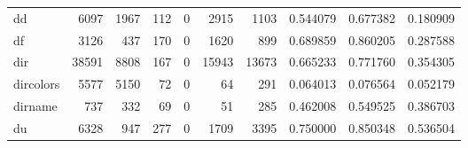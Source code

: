 \begin{longtable}{lrrrrrrrrr}
dd        &                                               6097 &                                               1967 &                                                112 &                                                  0 &                                               2915 &                                               1103 &                                           0.544079 &                               0.677382 &                             0.180909 \\
df        &                                               3126 &                                                437 &                                                170 &                                                  0 &                                               1620 &                                                899 &                                           0.689859 &                               0.860205 &                             0.287588 \\
dir       &                                              38591 &                                               8808 &                                                167 &                                                  0 &                                              15943 &                                              13673 &                                           0.665233 &                               0.771760 &                             0.354305 \\
dircolors &                                               5577 &                                               5150 &                                                 72 &                                                  0 &                                                 64 &                                                291 &                                           0.064013 &                               0.076564 &                             0.052179 \\
dirname   &                                                737 &                                                332 &                                                 69 &                                                  0 &                                                 51 &                                                285 &                                           0.462008 &                               0.549525 &                             0.386703 \\
du        &                                               6328 &                                                947 &                                                277 &                                                  0 &                                               1709 &                                               3395 &                                           0.750000 &                               0.850348 &                             0.536504 \\

\end{longtable}
